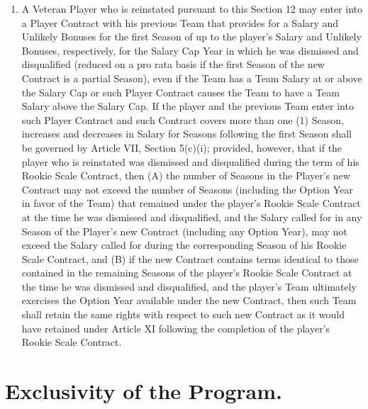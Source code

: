 \documentclass[
]{book}
\begin{document}
\begin{enumerate}
\begin{enumerate}
  \item
    A Veteran Player who is reinstated pursuant to this Section 12 may enter into a Player Contract with his previous Team that provides for a Salary and Unlikely Bonuses for the first Season of up to the player's Salary and Unlikely Bonuses, respectively, for the Salary Cap Year in which he was dismissed and disqualified (reduced on a pro rata basis if the first Season of the new Contract is a partial Season), even if the Team has a Team Salary at or above the Salary Cap or such Player Contract causes the Team to have a Team Salary above the Salary Cap. If the player and the previous Team enter into such Player Contract and such Contract covers more than one (1) Season, increases and decreases in Salary for Seasons following the first Season shall be governed by Article VII, Section 5(c)(i); provided, however, that if the player who is reinstated was dismissed and disqualified during the term of his Rookie Scale Contract, then (A) the number of Seasons in the Player's new Contract may not exceed the number of Seasons (including the Option Year in favor of the Team) that remained under the player's Rookie Scale Contract at the time he was dismissed and disqualified, and the Salary called for in any Season of the Player's new Contract (including any Option Year), may not exceed the Salary called for during the corresponding Season of his Rookie Scale Contract, and (B) if the new Contract contains terms identical to those contained in the remaining Seasons of the player's Rookie Scale Contract at the time he was dismissed and disqualified, and the player's Team ultimately exercises the Option Year available under the new Contract, then such Team shall retain the same rights with respect to such new Contract as it would have retained under Article XI following the completion of the player's Rookie Scale Contract.
  \end{enumerate}
\end{enumerate}

\hypertarget{exclusivity-of-the-program.}{%
\section{Exclusivity of the Program.}\label{exclusivity-of-the-program.}}
\end{document}

